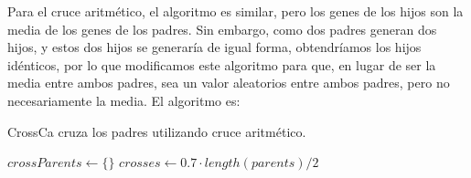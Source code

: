 \documentclass[11pt,a4paper]{article}
\begin{document}
Para el cruce aritmético, el algoritmo es similar, pero los genes de los hijos son la media de los genes de los padres. Sin embargo, como dos padres generan dos hijos, y estos dos hijos se generaría de igual forma, obtendríamos los hijos idénticos, por lo que modificamos este algoritmo para que, en lugar de ser la media entre ambos padres, sea un valor aleatorios entre ambos padres, pero no necesariamente la media. El algoritmo es: \\
\begin{algorithm}[H]
	\caption{{\sc CrossCa} cruza los padres utilizando cruce aritmético.}
	
	$crossParents \gets \{\}$ \;
	$crosses \gets 0.7 \cdot length(parents) \slash 2$ \;
	
	
	 \;
\end{algorithm}
\end{document}
